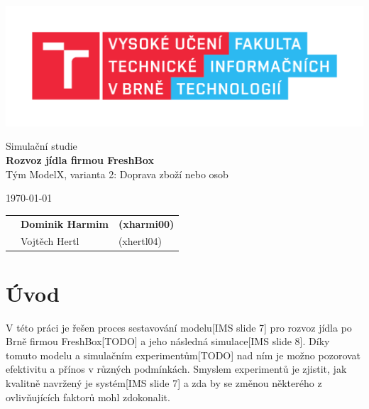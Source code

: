 \documentclass[a4paper, 11pt]{article}
\begin{document}
	\begin{titlepage}
		\begin{center}
			\includegraphics[width=0.77\linewidth]{inc/FIT_logo.pdf} \\


			\Huge{Simulační studie} \\
			\LARGE{\textbf{Rozvoz jídla firmou FreshBox}} \\
			\Large{Tým ModelX, varianta 2: Doprava zboží nebo osob}
		\end{center}

		\begin{minipage}{0.4 \textwidth}
			{\Large \today}
		\end{minipage}
		\hfill
		\begin{minipage}[r]{0.6 \textwidth}
			\Large
			\begin{tabular}{l l l}
				& \textbf{Dominik Harmim} & \textbf{(xharmi00)} \\
				& Vojtěch Hertl & (xhertl04) \\
			\end{tabular}
		\end{minipage}
	\end{titlepage}



	\setcounter{page}{1}
	\tableofcontents
	\clearpage



	\setcounter{page}{1}

	\section{Úvod}

	V této práci je řešen proces sestavování modelu[IMS slide 7] pro rozvoz jídla po Brně firmou FreshBox[TODO] a jeho následná simulace[IMS slide 8]. Díky tomuto modelu a simulačním experimentům[TODO] nad ním je možno pozorovat efektivitu a přínos v různých podmínkách. Smyslem experimentů je zjistit, jak kvalitně navržený je systém[IMS slide 7] a zda by se změnou některého z ovlivňujících faktorů mohl zdokonalit. 
\end{document}
